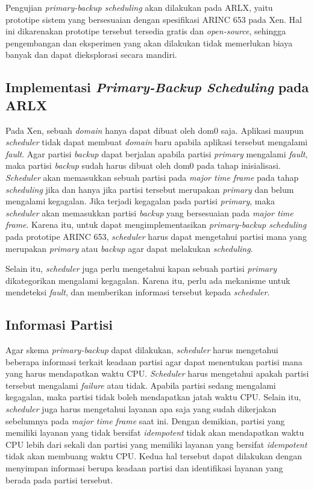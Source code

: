 Pengujian \textit{primary-backup scheduling} akan dilakukan pada ARLX, yaitu prototipe sistem
yang bersesuaian dengan spesifikasi ARINC 653 pada Xen. Hal ini dikarenakan prototipe tersebut
tersedia gratis dan \textit{open-source}, sehingga pengembangan dan eksperimen yang akan
dilakukan tidak memerlukan biaya banyak dan dapat dieksplorasi secara mandiri.

\subsection{Implementasi \textit{Primary-Backup Scheduling} pada ARLX}

Pada Xen, sebuah \textit{domain} hanya dapat dibuat oleh dom0 saja.  Aplikasi maupun
\textit{scheduler} tidak dapat membuat \textit{domain} baru apabila aplikasi tersebut mengalami
\textit{fault}.  Agar partisi \textit{backup} dapat berjalan apabila partisi \textit{primary}
mengalami \textit{fault}, maka partisi \textit{backup} sudah harus dibuat oleh dom0 pada tahap
inisialisasi.  \textit{Scheduler} akan memasukkan sebuah partisi pada \textit{major time frame}
pada tahap \textit{scheduling} jika dan hanya jika partisi tersebut merupakan \textit{primary}
dan belum mengalami kegagalan.  Jika terjadi kegagalan pada partisi \textit{primary}, maka
\textit{scheduler} akan memasukkan partisi \textit{backup} yang bersesuaian pada \textit{major
time frame}.  Karena itu, untuk dapat mengimplementasikan \textit{primary-backup scheduling}
pada prototipe ARINC 653, \textit{scheduler} harus dapat mengetahui partisi mana yang merupakan
\textit{primary} atau \textit{backup} agar dapat melakukan \textit{scheduling}.

Selain itu, \textit{scheduler} juga perlu mengetahui kapan sebuah partisi \textit{primary}
dikategorikan mengalami kegagalan. Karena itu, perlu ada mekanisme untuk mendeteksi
\textit{fault}, dan memberikan informasi tersebut kepada \textit{scheduler}.

\subsection{Informasi Partisi}
\label{section:informasi_partisi}

Agar skema \textit{primary-backup} dapat dilakukan, \textit{scheduler} harus mengetahui beberapa
informasi terkait keadaan partisi agar dapat menentukan partisi mana yang harus mendapatkan
waktu CPU. \textit{Scheduler} harus mengetahui apakah partisi tersebut mengalami
\textit{failure} atau tidak. Apabila partisi sedang mengalami kegagalan, maka partisi tidak
boleh mendapatkan jatah waktu CPU. Selain itu, \textit{scheduler} juga harus mengetahui
layanan apa saja yang sudah dikerjakan sebelumnya pada \textit{major time frame} saat
ini. Dengan demikian, partisi yang memiliki layanan yang tidak bersifat
\textit{idempotent} tidak akan mendapatkan waktu CPU lebih dari sekali dan partisi yang memiliki
layanan yang bersifat \textit{idempotent} tidak akan membuang waktu CPU. Kedua hal
tersebut dapat dilakukan dengan menyimpan informasi berupa keadaan partisi dan identifikasi
layanan yang berada pada partisi tersebut.

